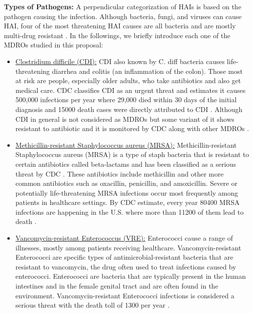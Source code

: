 {\bf Types of Pathogens:}
A perpendicular categorization of HAIs is based on the pathogen causing the infection. Although bacteria, fungi, and viruses can cause HAI, four of the most threatening HAI causes are all bacteria and are mostly multi-drug resistant  \cite{resistance, siegel2007management}. In the followings, we briefly introduce each one of the MDROs studied in this proposal:

\begin{itemize}
	\item \underline{Clostridium difficile (CDI):} CDI also known by C. diff bacteria causes life-threatening diarrhea and colitis (an inflammation of the colon). 
	Those most at risk are people, especially older adults, who take antibiotics and also get medical care. CDC classifies CDI as an urgent threat and estimates it causes 500,000 infections per year where 29,000 died within 30 days of the initial diagnosis and 15000 death cases were directly attributed to CDI \cite{resistance}. Although CDI in general is not considered as MDROs but some variant of it shows resistant to antibiotic  \cite{tenover2012antimicrobial, spigaglia2016recent} and it is monitored by CDC along with other MDROs \cite{cdimdro}. 
	\item \underline{Methicillin-resistant Staphylococcus aureus (MRSA):}  Methicillin-resistant Staphylococcus aureus (MRSA) is a type of staph bacteria that is resistant to certain antibiotics called beta-lactams and has been classified as a serious threat by CDC \cite{resistance}. These antibiotics include methicillin and other more common antibiotics such as oxacillin, penicillin, and amoxicillin. Severe or potentially life-threatening MRSA infections occur most frequently among patients in healthcare settings. By CDC estimate, every year 80400 MRSA infections are happening in the U.S. where more than 11200 of them lead to death \cite{resistance}. 
	\item \underline{Vancomycin-resistant Enterococcus (VRE):} Enterococci cause a range of illnesses, mostly among patients receiving healthcare. Vancomycin-resistant Enterococci are specific types of antimicrobial-resistant bacteria that are resistant to vancomycin, the drug often used to treat infections caused by enterococci. Enterococci are bacteria that are typically present in the human intestines and in the female genital tract and are often found in the environment. Vancomycin-resistant Enterococci infections is considered a serious threat with the death toll of 1300 per year \cite{resistance}.

\end{itemize}
